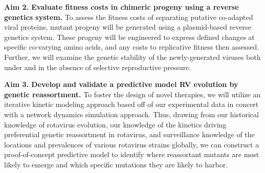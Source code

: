 \documentclass[11pt,letterpaper,final] {article}
\begin{document}
\textbf{Aim 2. Evaluate fitness costs in chimeric progeny using a reverse genetics system.} To assess the fitness costs of separating putative co-adapted viral proteins, mutant progeny will be generated using a plasmid-based reverse genetics system. These progeny will be engineered to express defined changes at specific co-varying amino acids, and any costs to replicative fitness then assessed. Further, we will examine the genetic stability of the newly-generated viruses both under and in the absence of selective reproductive pressure.

\textbf{Aim 3. Develop and validate a predictive model RV evolution by genetic reassortment.} To foster the design of novel therapies, we will utilize an iterative kinetic modeling approach based off of our experimental data in concert with a network dynamics simulation approach. Thus, drawing from our historical knowledge of rotavirus evolution, our knowledge of the kinetics driving preferential genetic reassortment in rotavirus, and surveillance knowledge of the locations and prevalences of various rotavirus strains globally, we can construct a proof-of-concept predictive model to identify where reassortant mutants are most likely to emerge and which specific mutations they are likely to harbor. 


% 
% 
\end{document}
